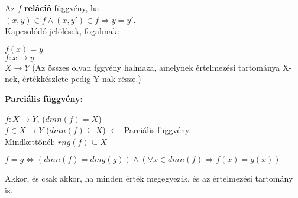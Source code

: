 \begin{frame}
\begin{tcolorbox}[title={Def.: Függvény, Parciális függvény}]
Az $f$ \textbf{reláció} függvény, ha\\
$(x, y) \in f \land (x, y') \in f \Rightarrow y = y'$.\\
\tcblower
Kapcsolódó jelölések, fogalmak:\\
\mmedskip

$f(x) = y$\\
$f : x \rightarrow y$\\
$X \rightarrow Y$ (Az összes olyan fggvény halmaza, amelynek értelmezési tartománya X-nek, értékkészlete pedig Y-nak része.)\\
\mmedskip

\textbf{Parciális függvény}:\\
\msmallskip

$f: X \rightarrow Y$, ($dmn(f) = X$)\\
$f \in X \rightarrow Y$ ($dmn(f) \subseteq X$) $\leftarrow$ Parciális függvény.\\
Mindkettőnél: $rng(f) \subseteq X$
\end{tcolorbox}

\begin{tcolorbox}[title={Mikor egyenlő két függvény?}]
$f = g \iff (dmn(f) = dmg(g)) \land ({\forall}x \in dmn(f) \Rightarrow f(x) = g(x))$\\
\mmedskip

Akkor, és csak akkor, ha minden érték megegyezik, és az értelmezési tartomány is.
\end{tcolorbox}
\end{frame}

